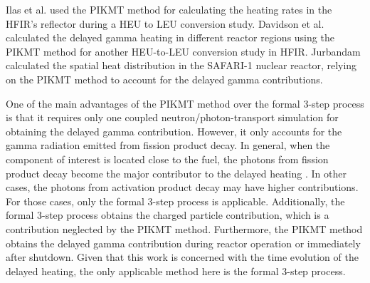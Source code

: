 Ilas et al. \cite{ilas_impact_2013} used the PIKMT method for calculating the heating rates in the \gls*{HFIR}’s reflector during a \gls*{HEU} to \gls*{LEU} conversion study.
%
Davidson et al. \cite{davidson_heat_2017} calculated the delayed gamma heating in different reactor regions using the PIKMT method for another HEU-to-LEU conversion study in HFIR.
Jurbandam \cite{jurbandam_calculation_2018} calculated the spatial heat distribution in the SAFARI-1 nuclear reactor, relying on the PIKMT method to account for the delayed gamma contributions.

One of the main advantages of the PIKMT method over the formal 3-step process is that it requires only one coupled neutron/photon-transport simulation for obtaining the delayed gamma contribution.
However, it only accounts for the gamma radiation emitted from fission product decay.
In general, when the component of interest is located close to the fuel, the photons from fission product decay become the major contributor to the delayed heating \cite{lemaire_estimation_2015}.
In other cases, the photons from activation product decay may have higher contributions.
For those cases, only the formal 3-step process is applicable.
Additionally, the formal 3-step process obtains the charged particle contribution, which is a contribution neglected by the PIKMT method.
Furthermore, the PIKMT method obtains the delayed gamma contribution during reactor operation or immediately after shutdown.
Given that this work is concerned with the time evolution of the delayed heating, the only applicable method here is the formal 3-step process.

